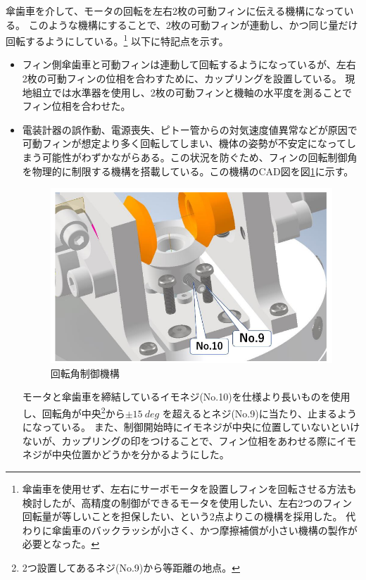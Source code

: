 \documentclass[a4paper,11pt,uplatex]{jsarticle}
\begin{document}
傘歯車を介して、モータの回転を左右2枚の可動フィンに伝える機構になっている。
このような機構にすることで、2枚の可動フィンが連動し、かつ同じ量だけ回転するようにしている。\footnote{
	傘歯車を使用せず、左右にサーボモータを設置しフィンを回転させる方法も検討したが、高精度の制御ができるモータを使用したい、左右2つのフィン回転量が等しいことを担保したい、という2点よりこの機構を採用した。
	代わりに傘歯車のバックラッシが小さく、かつ摩擦補償が小さい機構の製作が必要となった。}
以下に特記点を示す。
\begin{itemize}
	\item フィン側傘歯車と可動フィンは連動して回転するようになっているが、左右2枚の可動フィンの位相を合わすために、カップリングを設置している。
	      現地組立では水準器を使用し、2枚の可動フィンと機軸の水平度を測ることでフィン位相を合わせた。
	      \\
	\item 電装計器の誤作動、電源喪失、ピトー管からの対気速度値異常などが原因で可動フィンが想定より多く回転してしまい、機体の姿勢が不安定になってしまう可能性がわずかながらある。この状況を防ぐため、フィンの回転制御角を物理的に制限する機構を搭載している。この機構のCAD図を図\ref{s_r_kadouiki}に示す。
	      \begin{figure}[H]
		      \centering
		      \includegraphics[scale = 0.5]{pic_str/s_r_kadouiki.png}
		      \caption{回転角制御機構}
		      \label{s_r_kadouiki}
	      \end{figure}
	      モータと傘歯車を締結しているイモネジ(No.10)を仕様より長いものを使用し、回転角が中央\footnote{2つ設置してあるネジ(No.9)から等距離の地点。}から$\pm \SI{15}{deg}$ を超えるとネジ(No.9)に当たり、止まるようになっている。
	      また、制御開始時にイモネジが中央に位置していないといけないが、カップリングの印をつけることで、フィン位相をあわせる際にイモネジが中央位置かどうかを分かるようにした。

\end{itemize}
\end{document}
